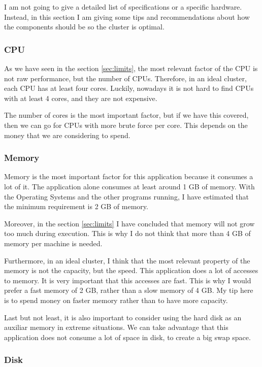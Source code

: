 I am not going to give a detailed list of specifications or a specific
hardware. Instead, in this section I am giving some tips and recommendations
about how the components should be so the cluster is optimal.

\subsubsection*{CPU}

As we have seen in the section \ref{sec:limits}, the most relevant factor of
the CPU is not raw performance, but the number of CPUs. Therefore, in an ideal
cluster, each CPU has at least four cores. Luckily, nowadays it is not hard to
find CPUs with at least 4 cores, and they are not expensive.

The number of cores is the most important factor, but if we have this covered,
then we can go for CPUs with more brute force per core. This depends on the
money that we are considering to spend.

\subsubsection*{Memory}

Memory is the most important factor for this application because it consumes a
lot of it. The application alone consumes at least around 1 GB of memory. With
the Operating Systems and the other programs running, I have estimated that the
minimum requirement is 2 GB of memory.

Moreover, in the section \ref{sec:limits} I have concluded that memory will not
grow too much during execution. This is why I do not think that more than 4 GB
of memory per machine is needed.

Furthermore, in an ideal cluster, I think that the most relevant property of
the memory is not the capacity, but the speed. This application does a lot of
accesses to memory. It is very important that this accesses are fast. This is
why I would prefer a fast memory of 2 GB, rather than a slow memory of 4 GB. My
tip here is to spend money on faster memory rather than to have more capacity.

Last but not least, it is also important to consider using the hard disk as an
auxiliar memory in extreme situations. We can take advantage that this
application does not consume a lot of space in disk, to create a big swap space.

\subsubsection*{Disk}

